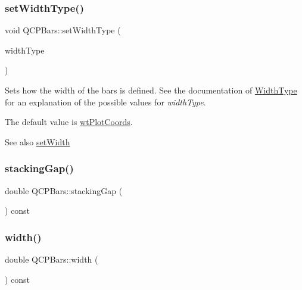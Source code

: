\subsubsection{\texorpdfstring{set\+Width\+Type()}{setWidthType()}}
{\footnotesize\ttfamily void Q\+C\+P\+Bars\+::set\+Width\+Type (\begin{DoxyParamCaption}\item[{\hyperlink{class_q_c_p_bars_a65dbbf1ab41cbe993d71521096ed4649}{Q\+C\+P\+Bars\+::\+Width\+Type}}]{width\+Type }\end{DoxyParamCaption})}

Sets how the width of the bars is defined. See the documentation of \hyperlink{class_q_c_p_bars_a65dbbf1ab41cbe993d71521096ed4649}{Width\+Type} for an explanation of the possible values for {\itshape width\+Type}.

The default value is \hyperlink{class_q_c_p_bars_a65dbbf1ab41cbe993d71521096ed4649aad3cc60ae1bfb1160a30237bee9eaf10}{wt\+Plot\+Coords}.

\begin{DoxySeeAlso}{See also}
\hyperlink{class_q_c_p_bars_afec6116579d44d5b706e0fa5e5332507}{set\+Width} 
\end{DoxySeeAlso}
\mbox{\label{class_q_c_p_bars_a2e6192fa9c16df7ba94cd50c0c9ec7ce}} 
\subsubsection{\texorpdfstring{stacking\+Gap()}{stackingGap()}}
{\footnotesize\ttfamily double Q\+C\+P\+Bars\+::stacking\+Gap (\begin{DoxyParamCaption}{ }\end{DoxyParamCaption}) const\hspace{0.3cm}{\ttfamily [inline]}}

\mbox{\label{class_q_c_p_bars_abe7eb3987d8711f45829db879aee2280}} 
\subsubsection{\texorpdfstring{width()}{width()}}
{\footnotesize\ttfamily double Q\+C\+P\+Bars\+::width (\begin{DoxyParamCaption}{ }\end{DoxyParamCaption}) const\hspace{0.3cm}{\ttfamily [inline]}}

